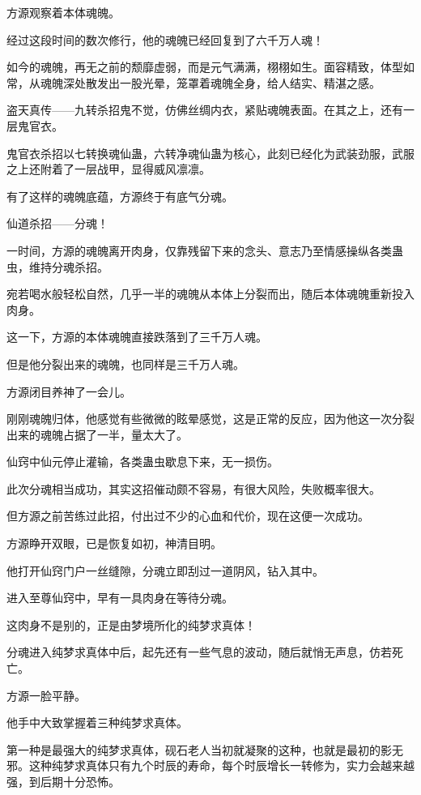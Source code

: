 
\begin{this_body}



方源观察着本体魂魄。

经过这段时间的数次修行，他的魂魄已经回复到了六千万人魂！

如今的魂魄，再无之前的颓靡虚弱，而是元气满满，栩栩如生。面容精致，体型如常，从魂魄深处散发出一股光晕，笼罩着魂魄全身，给人结实、精湛之感。

盗天真传——九转杀招鬼不觉，仿佛丝绸内衣，紧贴魂魄表面。在其之上，还有一层鬼官衣。

鬼官衣杀招以七转换魂仙蛊，六转净魂仙蛊为核心，此刻已经化为武装劲服，武服之上还附着了一层战甲，显得威风凛凛。

有了这样的魂魄底蕴，方源终于有底气分魂。

仙道杀招——分魂！

一时间，方源的魂魄离开肉身，仅靠残留下来的念头、意志乃至情感操纵各类蛊虫，维持分魂杀招。

宛若喝水般轻松自然，几乎一半的魂魄从本体上分裂而出，随后本体魂魄重新投入肉身。

这一下，方源的本体魂魄直接跌落到了三千万人魂。

但是他分裂出来的魂魄，也同样是三千万人魂。

方源闭目养神了一会儿。

刚刚魂魄归体，他感觉有些微微的眩晕感觉，这是正常的反应，因为他这一次分裂出来的魂魄占据了一半，量太大了。

仙窍中仙元停止灌输，各类蛊虫歇息下来，无一损伤。

此次分魂相当成功，其实这招催动颇不容易，有很大风险，失败概率很大。

但方源之前苦练过此招，付出过不少的心血和代价，现在这便一次成功。

方源睁开双眼，已是恢复如初，神清目明。

他打开仙窍门户一丝缝隙，分魂立即刮过一道阴风，钻入其中。

进入至尊仙窍中，早有一具肉身在等待分魂。

这肉身不是别的，正是由梦境所化的纯梦求真体！

分魂进入纯梦求真体中后，起先还有一些气息的波动，随后就悄无声息，仿若死亡。

方源一脸平静。

他手中大致掌握着三种纯梦求真体。

第一种是最强大的纯梦求真体，砚石老人当初就凝聚的这种，也就是最初的影无邪。这种纯梦求真体只有九个时辰的寿命，每个时辰增长一转修为，实力会越来越强，到后期十分恐怖。


\end{this_body}
